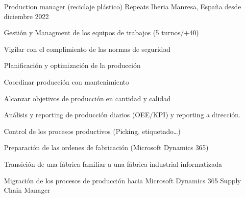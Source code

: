 

\begin{cventries}

  \cventry
  {Production manager (reciclaje plástico)} %
  {Repeats Iberia} %
  {Manresa, España} %
  {desde diciembre 2022} %
  {
    \begin{cvitems} %
      \item {Gestión y Managment de los equipos de trabajos (5 turnos/+40)}
      \item {Vigilar con el complimiento de las normas de seguridad}
      \item {Planificación y optimización de la producción}
      \item {Coordinar producción con mantenimiento}
      \item {Alcanzar objetivos de producción en cantidad y calidad}
      \item {Análisis y reporting de producción diarios (OEE/KPI) y reporting a dirección.}
      \item {Control de los procesos productivos (Picking, etiquetado…)}
      \item {Preparación de las ordenes de fabricación (Microsoft Dynamics 365)}
      \item {Transición de una fábrica familiar a una fábrica industrial informatizada}
      \item {Migración de los procesos de producción hacia Microsoft Dynamics 365 Supply Chain Manager}
    \end{cvitems}
  }


\end{cventries}
